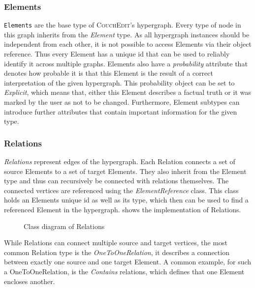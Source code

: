\subsubsection{Elements}
\texttt{Elements} are the base type of \textsc{CouchEdit}'s hypergraph. Every type of node in this graph inherits from the \emph{Element} type. As all hypergraph instances should be independent from each other, it is not possible to access Elements via their object reference. Thus every Element has a unique id that can be used to reliably identify it across multiple graphs. Elements also have a \emph{probability} attribute that denotes how probable it is that this Element is the result of a correct interpretation of the given hypergraph. This probability object can be set to \emph{Explicit}, which means that, either this Element describes a factual truth or it was marked by the user as not to be changed. Furthermore, Element subtypes can introduce further attributes that contain important information for the given type.

\subsubsection{Relations}
\emph{Relations} represent edges of the hypergraph. Each Relation connects a set of source Elements to a set of target Elements. They also inherit from the Element type and thus can recursively be connected with relations themselves. The connected vertices are referenced using the \emph{ElementReference} class. This class holds an Elements unique id as well as its type, which then can be used to find a referenced Element in the hypergraph.  shows the implementation of Relations. 

\begin{figure}[ht]
  \centering
  
  \caption{Class diagram of Relations}
  \label{fig:relations}
\end{figure}

 While Relations can connect multiple source and target vertices, the most common Relation type is the \emph{OneToOneRelation}, it describes a connection between exactly one source and one target Element. A common example, for such a OneToOneRelation, is the \emph{Contains} relations, which defines that one Element encloses another.  


